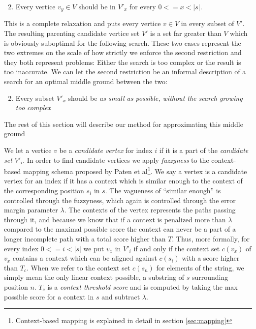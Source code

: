 \documentclass[thesis.tex]{subfiles}
\begin{document}
\begin{enumerate}
  \setcounter{enumi}{1}
  \item Every vertice $v_y \in V$ should be in $V'_x$ for every $0<=x<|s|$.
\end{enumerate}
This is a complete relaxation and puts every vertice $v \in V$ in every subset of $V'$. The resulting parenting candidate vertice set $V'$ is a set far greater than $V$ which is obviously suboptimal for the following search. These two cases represent the two extremes on the scale of how strictly we enforce the second restriction and they both represent problems: Either the search is too complex or the result is too inaccurate. We can let the second restriction be an informal description of a search for an optimal middle ground between the two:
\begin{enumerate}
  \setcounter{enumi}{1}
  \item Every subset $V'_x$ should be \textit{as small as possible, without the search growing too complex}
\end{enumerate}
The rest of this section will describe our method for approximating this middle ground\\
\par\noindent
We let a vertice $v$ be a \textit{candidate vertex} for index $i$ if it is a part of the \textit{candidate set} $V'_i$. In order to find candidate vertices we apply \textit{fuzzyness} to the context-based mapping schema proposed by Paten et al\footnote{Context-based mapping is explained in detail in section \ref{sec:mapping}}. We say a vertex is a candidate vertex for an index if it has a context which is similar enough to the context of the corresponding position $s_i$ in $s$. The vagueness of ``similar enough'' is controlled through the fuzzyness, which again is controlled through the error margin parameter $\lambda$. The contexts of the vertex represents the paths passing through it, and because we know that if a context is penalized more than $\lambda$ compared to the maximal possible score the context can never be a part of a longer incomplete path with a total score higher than $T$. Thus, more formally, for every index $0<=i<|s|$ we put $v_x$ in $V'_i$ if and only if the context set $c(v_x)$ of $v_x$ contains a context which can be aligned against $c(s_i)$ with a score higher than $T_c$. When we refer to the context set $c(s_n)$ for elements of the string, we simply mean the only linear context possible, a substring of $s$ surrounding position $n$. $T_c$ is a \textit{context threshold score} and is computed by taking the max possible score for a context in $s$ and subtract $\lambda$.\\
\end{document}
